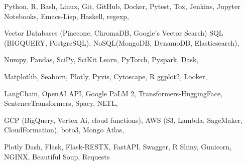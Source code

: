 


\begin{cvskills}


{
Python, R, Bash, Linux, Git, GitHub, Docker, Pytest, Tox, Jenkins, Jupyter Notebooks, Emacs-Lisp, Haskell, regexp,
}

{
Vector Databases (Pinecone, ChromaDB, Google's Vector Search) SQL (BIGQUERY, PostgreSQL), NoSQL(MongoDB, DynamoDB, Elasticsearch),
}

{
Numpy, Pandas, SciPy, SciKit Learn, PyTorch, Pyspark, Dask,
}

{
Matplotlib, Seaborn, Plotly, Pyvis, Cytoscape, R ggplot2, Looker,
}

{
LangChain, OpenAI API, Google PaLM 2, Transformers-HuggingFace, SentenceTransformers, Spacy, NLTL, 
}

{
GCP (BigQuery, Vertex Ai, cloud functions), AWS (S3, Lambda, SageMaker, CloudFormation), boto3, Mongo Atlas,
}

{
Plotly Dash, Flask, Flask-RESTX, FastAPI, Swagger, R Shiny, Gunicorn, NGINX, Beautiful Soup, Requests
}






\end{cvskills}
